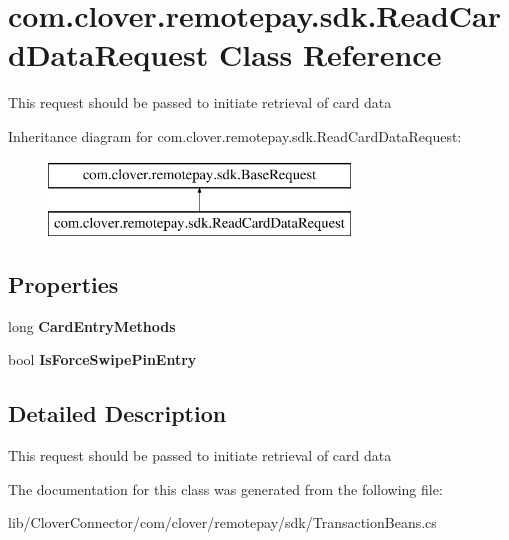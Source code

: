 \hypertarget{classcom_1_1clover_1_1remotepay_1_1sdk_1_1_read_card_data_request}{}\section{com.\+clover.\+remotepay.\+sdk.\+Read\+Card\+Data\+Request Class Reference}
\label{classcom_1_1clover_1_1remotepay_1_1sdk_1_1_read_card_data_request}


This request should be passed to initiate retrieval of card data  


Inheritance diagram for com.\+clover.\+remotepay.\+sdk.\+Read\+Card\+Data\+Request\+:\begin{figure}[H]
\begin{center}
\leavevmode
\includegraphics[height=2.000000cm]{classcom_1_1clover_1_1remotepay_1_1sdk_1_1_read_card_data_request}
\end{center}
\end{figure}
\subsection*{Properties}
\begin{DoxyCompactItemize}
\item 
\mbox{\label{classcom_1_1clover_1_1remotepay_1_1sdk_1_1_read_card_data_request_a7ca867a2e97f195f0b16c038e3364708}} 
long {\bfseries Card\+Entry\+Methods}
\item 
\mbox{\label{classcom_1_1clover_1_1remotepay_1_1sdk_1_1_read_card_data_request_aa5fa167d2609b5e1944d7a328313e9ad}} 
bool {\bfseries Is\+Force\+Swipe\+Pin\+Entry}
\end{DoxyCompactItemize}


\subsection{Detailed Description}
This request should be passed to initiate retrieval of card data 



The documentation for this class was generated from the following file\+:\begin{DoxyCompactItemize}
\item 
lib/\+Clover\+Connector/com/clover/remotepay/sdk/Transaction\+Beans.\+cs\end{DoxyCompactItemize}
